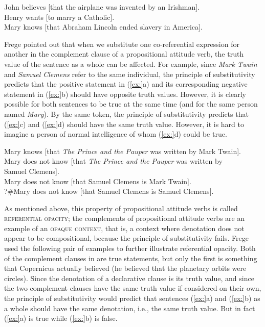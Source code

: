\ea
\ea John believes [that the airplane was invented by an Irishman].\\
\ex Henry wants [to marry a Catholic].\\
\ex Mary knows [that Abraham Lincoln ended slavery in America].
                       \z
\z


Frege pointed out that when we substitute one co-referential expression for another in the complement clause of a propositional attitude verb, the truth value of the sentence as a whole can be affected. For example, since \textit{Mark Twain} and \textit{Samuel Clemens} refer to the same individual, the principle of substitutivity predicts that the positive statement in (\ref{ex:}a) and its corresponding negative statement in (\ref{ex:}b) should have opposite truth values. However, it is clearly possible for both sentences to be true at the same time (and for the same person named \textit{Mary}). By the same token, the principle of substitutivity predicts that (\ref{ex:}c) and (\ref{ex:}d) should have the same truth value. However, it is hard to imagine a person of normal intelligence of whom (\ref{ex:}d) could be true.


\ea
\ea Mary knows [that \textit{The Prince and the Pauper} was written by Mark Twain].\\
\ex Mary does not know [that \textit{The Prince and the Pauper} was written by\\
  Samuel Clemens].\\
\ex Mary does not know [that Samuel Clemens is Mark Twain].\\
\ex ?\#Mary does not know [that Samuel Clemens is Samuel Clemens].
                       \z
\z


As mentioned above, this property of propositional attitude verbs is called \textsc{referential opacity}; the complements of propositional attitude verbs are an example of an \textsc{opaque context}, that is, a context where denotation does not appear to be compositional, because the principle of substitutivity fails. Frege used the following pair of examples to further illustrate referential opacity. Both of the complement clauses in  are true statements, but only the first is something that Copernicus actually believed (he believed that the planetary orbits were circles). Since the denotation of a declarative clause is its truth value, and since the two complement clauses have the same truth value if considered on their own, the principle of substitutivity would predict that sentences (\ref{ex:}a) and (\ref{ex:}b) as a whole should have the same denotation, i.e., the same truth value. But in fact (\ref{ex:}a) is true while (\ref{ex:}b) is false.



